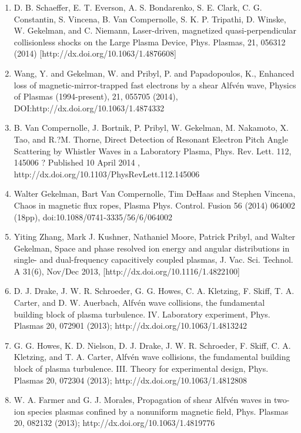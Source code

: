 \documentclass[11pt]{article}
\begin{document}
\begin{enumerate}
\item   D. B. Schaeffer, E. T. Everson, A. S. Bondarenko, S. E. Clark, C. G. Constantin, S. Vincena, B. Van Compernolle, S. K. P. Tripathi, D. Winske, W. Gekelman, and C. Niemann, Laser-driven, magnetized quasi-perpendicular collisionless shocks on the Large Plasma Device, Phys. Plasmas, 21, 056312 (2014) [http://dx.doi.org/10.1063/1.4876608]

\item  Wang, Y. and Gekelman, W. and Pribyl, P. and Papadopoulos, K., Enhanced loss of magnetic-mirror-trapped fast electrons by a shear Alfv\'{e}n wave, Physics of Plasmas (1994-present), 21, 055705 (2014), DOI:http://dx.doi.org/10.1063/1.4874332

\item   B. Van Compernolle, J. Bortnik, P. Pribyl, W. Gekelman, M. Nakamoto, X. Tao, and R.?M. Thorne, Direct Detection of Resonant Electron Pitch Angle Scattering by Whistler Waves in a Laboratory Plasma, Phys. Rev. Lett. 112, 145006 ? Published 10 April 2014 , http://dx.doi.org/10.1103/PhysRevLett.112.145006

\item  Walter Gekelman, Bart Van Compernolle, Tim DeHaas and Stephen Vincena, Chaos in magnetic flux ropes, Plasma Phys. Control. Fusion 56 (2014) 064002 (18pp), doi:10.1088/0741-3335/56/6/064002

\item   Yiting Zhang, Mark J. Kushner, Nathaniel Moore, Patrick Pribyl, and Walter Gekelman, Space and phase resolved ion energy and angular distributions in single- and dual-frequency capacitively coupled plasmas, J. Vac. Sci. Technol. A 31(6), Nov/Dec 2013, [http://dx.doi.org/10.1116/1.4822100]

\item  D. J. Drake, J. W. R. Schroeder, G. G. Howes, C. A. Kletzing, F. Skiff, T. A. Carter, and D. W. Auerbach, Alfv\'{e}n wave collisions, the fundamental building block of plasma turbulence. IV. Laboratory experiment, Phys. Plasmas 20, 072901 (2013); http://dx.doi.org/10.1063/1.4813242

\item  G. G. Howes, K. D. Nielson, D. J. Drake, J. W. R. Schroeder, F. Skiff, C. A. Kletzing, and T. A. Carter, Alfv\'{e}n wave collisions, the fundamental building block of plasma turbulence. III. Theory for experimental design, Phys. Plasmas 20, 072304 (2013); http://dx.doi.org/10.1063/1.4812808

\item  W. A. Farmer and G. J. Morales, Propagation of shear Alfv\'{e}n waves in two-ion species plasmas confined by a nonuniform magnetic field, Phys. Plasmas 20, 082132 (2013); http://dx.doi.org/10.1063/1.4819776


\end{enumerate}
\end{document}
